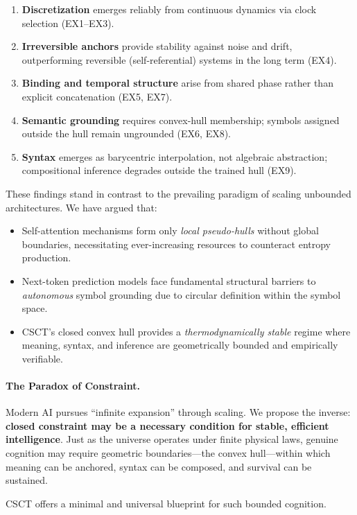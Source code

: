 \documentclass{article}
\begin{document}
\begin{enumerate}
    \item \textbf{Discretization} emerges reliably from continuous dynamics via clock selection (EX1--EX3).
    \item \textbf{Irreversible anchors} provide stability against noise and drift, outperforming reversible (self-referential) systems in the long term (EX4).
    \item \textbf{Binding and temporal structure} arise from shared phase rather than explicit concatenation (EX5, EX7).
    \item \textbf{Semantic grounding} requires convex-hull membership; symbols assigned outside the hull remain ungrounded (EX6, EX8).
    \item \textbf{Syntax} emerges as barycentric interpolation, not algebraic abstraction; compositional inference degrades outside the trained hull (EX9).
\end{enumerate}

These findings stand in contrast to the prevailing paradigm of scaling unbounded architectures.
We have argued that:
\begin{itemize}
    \item Self-attention mechanisms form only \emph{local pseudo-hulls} without global boundaries, necessitating ever-increasing resources to counteract entropy production.
    \item Next-token prediction models face fundamental structural barriers to \emph{autonomous} symbol grounding due to circular definition within the symbol space.
    \item CSCT's closed convex hull provides a \emph{thermodynamically stable} regime where meaning, syntax, and inference are geometrically bounded and empirically verifiable.
\end{itemize}

\paragraph{The Paradox of Constraint.}
Modern AI pursues ``infinite expansion'' through scaling.
We propose the inverse: \textbf{closed constraint may be a necessary condition for stable, efficient intelligence}.
Just as the universe operates under finite physical laws, genuine cognition may require geometric boundaries---the convex hull---within which meaning can be anchored, syntax can be composed, and survival can be sustained.

CSCT offers a minimal and universal blueprint for such bounded cognition.
\end{document}
